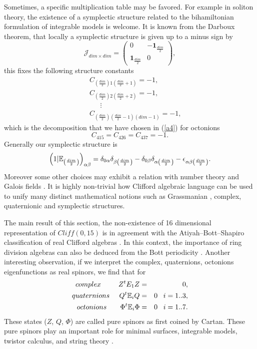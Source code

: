 \documentclass[a4paper,12pt]{book}
\begin{document}
Sometimes, a specific multiplication table may be favored. For example in
soliton theory, the existence of a symplectic structure related to the
bihamiltonian formulation of integrable models is welcome. It is known from
the Darboux theorem, that locally a symplectic structure is given up to a
minus sign by 
\begin{equation}
\mathcal{J}_{dim\times dim}=\left( 
\begin{array}{cc}
0 & -\mathbf{1}_{\frac{dim}{2}} \\ 
\mathbf{1}_{\frac{dim}{2}} & 0
\end{array}
\right) ,
\end{equation}
this fixes the following structure constants 
\begin{eqnarray}
&&C_{\left( {\frac{dim}{2}}\right) 1\left( {\frac{dim}{2}}+1\right) }=-1, \\
&&C_{\left( {\frac{dim}{2}}\right) 2\left( {\frac{dim}{2}}+2\right) }=-1, \\
&&~~~~~~~\vdots \\
&&C_{\left( {\frac{dim}{2}}\right) \left( {\frac{dim}{2}}-1\right) \left(
dim-1\right) }=-1,
\end{eqnarray}
which is the decomposition that we have chosen in (\ref{a4}) for octonions 
\begin{equation}
C_{415}=C_{426}=C_{437}=-1.
\end{equation}
Generally our symplectic structure is 
\begin{equation}
\left( 1|\Bbb{E}_{\left( {\frac{dim}{2}}\right) }\right) _{\alpha \beta
}=\delta _{0\alpha }\delta _{\beta \left( {\frac{dim}{2}}\right) }-\delta
_{0\beta }\delta _{\alpha \left( {\frac{dim}{2}}\right) }-\epsilon _{\alpha
\beta \left( {\frac{dim}{2}}\right) }.
\end{equation}
Moreover some other choices may exhibit a relation with number theory and
Galois fields \cite{dix}. It is highly non-trivial how Clifford algebraic
language can be used to unify many distinct mathematical notions such as
Grassmanian \cite{kh3}, complex, quaternionic and symplectic structures.

The main result of this section, the non-existence of 16 dimensional
representation of $Cliff\left( 0,15\right) $ is in agreement with the
Atiyah--Bott--Shapiro classification of real Clifford algebras \cite{abs}.
In this context, the importance of ring division algebras can also be
deduced from the Bott periodicity \cite{martucci}. Another interesting
observation, if we interpret the complex, quaternions, octonions
eigenfunctions as real spinors, we find that for 
\begin{eqnarray}
complex\;\;\;\;\;\;\;\;\;Z^{t}E_{1}Z &=&0, \\
quaternions\;\;\;\;\;Q^{t}\Bbb{E}_{i}Q &=&0\;\;\;i=1..3, \\
octonions\;\;\;\;\;\;\;\Phi ^{t}\Bbb{E}_{i}\Phi &=&0\;\;\;i=1..7.
\end{eqnarray}
These states ($Z$, $Q$, $\Phi $) are called pure spinors as first coined by
Cartan. These pure spinors play an important role for minimal surfaces,
integrable models, twistor calculus, and string theory \cite{budinich}.
\end{document}
